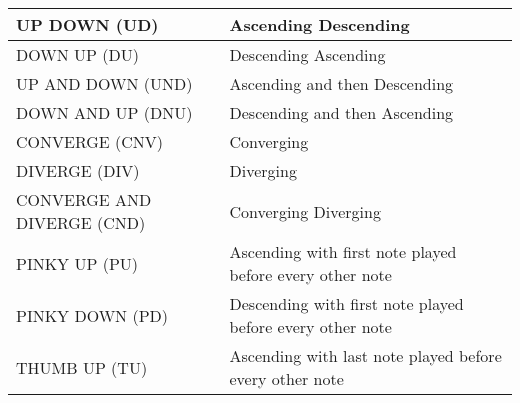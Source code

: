\begin{tabular}{|l|l|}
UP DOWN (UD)                 &  Ascending Descending                                                                                                                                                                   \\ \hline
DOWN UP (DU)                   & Descending Ascending                                                                                                                                                                  \\ \hline
UP AND DOWN (UND)                 & Ascending and then Descending                                                                                                                                                                 \\ \hline
DOWN AND UP (DNU)                & Descending and then Ascending                                                                                                                                                                   \\ \hline
CONVERGE (CNV)                & Converging                                                                                                                                                                      \\ \hline
DIVERGE (DIV)                & Diverging                                                                                                                                                                 \\ \hline
CONVERGE AND DIVERGE (CND)     & Converging Diverging                                                                                                                                                           \\ \hline
PINKY UP (PU)                & Ascending with first note played before every other note                                                                                                                             \\ \hline
PINKY DOWN (PD)                & Descending with first note played before every other note                                                                                                                                                                   \\ \hline
THUMB UP (TU)                & Ascending with last note played before every other note                                                                                                                                     \\ \hline

\end{tabular}
